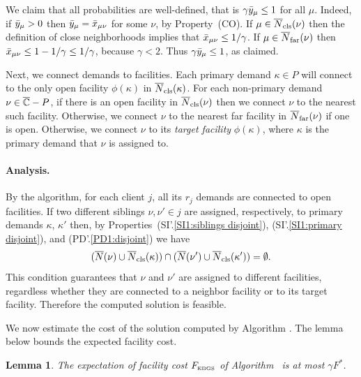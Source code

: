 \documentclass[oneside,final]{ucr}
\newtheorem{lemma}[theorem]{Lemma}
\begin{document}
We claim that all probabilities are well-defined, that is
$\gamma{\bar y}_{\mu} \le 1$ for all $\mu$. Indeed, if ${\bar y}_{\mu}>0$ then
${\bar y}_{\mu} = {\bar x}_{\mu\nu}$ for some $\nu$, by Property~(CO).
If $\mu\in {\overline{N}}_{{\mbox{\scriptsize\rm cls}}}(\nu)$ then the definition of close
neighborhoods implies that ${\bar x}_{\mu\nu} \le 1/\gamma$.
If $\mu\in {\overline{N}}_{{\mbox{\scriptsize\rm far}}}(\nu)$ then
${\bar x}_{\mu\nu} \le 1-1/\gamma \le 1/\gamma$, because $\gamma < 2$.
Thus $\gamma{\bar y}_{\mu} \le 1$, as claimed.

Next, we connect demands to facilities.  Each primary demand
$\kappa\in P$ will connect to the only open facility $\phi(\kappa)$ in
${\overline{N}}_{{\mbox{\scriptsize\rm cls}}}(\kappa)$.  For each non-primary demand $\nu\in \overline{\mathbb{C}}
- P$, if there is an open facility in ${\overline{N}}_{{\mbox{\scriptsize\rm cls}}}(\nu)$ then we
connect $\nu$ to the nearest such facility. Otherwise, we connect
$\nu$ to the nearest far facility in ${\overline{N}}_{{\mbox{\scriptsize\rm far}}}(\nu)$ if one is
open. Otherwise, we connect $\nu$ to its \emph{target facility}
$\phi(\kappa)$, where $\kappa$ is the primary demand that $\nu$ is
assigned to.


\paragraph{Analysis.}
By the algorithm, for each client $j$, all its $r_j$ demands are connected to
open facilities. If two different siblings $\nu,\nu'\in j$ are assigned, respectively,
to primary demands $\kappa$, $\kappa'$ then, by
Properties~(SI'.\ref{SI1:siblings disjoint}), (SI'.\ref{SI1:primary
  disjoint}), and (PD'.\ref{PD1:disjoint}) we have
%
\begin{equation*}
( {\overline{N}}(\nu) \cup {\overline{N}}_{{\mbox{\scriptsize\rm cls}}}(\kappa)) \cap ({\overline{N}}(\nu')\cup {\overline{N}}_{{\mbox{\scriptsize\rm cls}}}(\kappa')) = \emptyset.
\end{equation*}
%
This condition guarantees that $\nu$ and $\nu'$ are assigned to different facilities,
regardless whether they are connected to a neighbor facility or to its target facility.
Therefore the computed solution is feasible.

\medskip

We now estimate the cost of the solution computed by Algorithm {\EBGS}. The lemma
below bounds the expected facility cost.


\begin{lemma} \label{lem: EBGS facility cost}
The expectation of facility cost $F_{\mbox{\tiny\rm EBGS}}$ of Algorithm~{\EBGS} is at most $\gamma F^\ast$.
\end{lemma}
\end{document}
